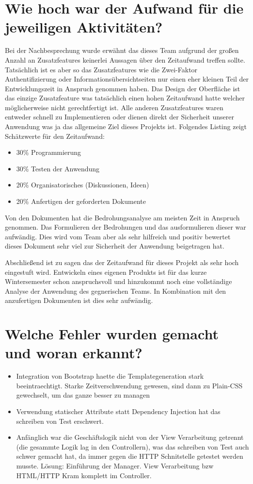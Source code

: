 \documentclass[12pt,DIV14,BCOR10mm,a4paper,parskip=half-,headsepline,headinclude,english,ngerman,bibliography=totocnumbered]{scrreprt}
\begin{document}
\section{Wie hoch war der Aufwand für die jeweiligen Aktivitäten?}
Bei der Nachbesprechung wurde erwähnt das dieses Team aufgrund der großen Anzahl an Zusatzfeatures keinerlei Aussagen über den Zeitaufwand treffen sollte. Tatsächlich ist es aber so das Zusatzfeatures wie die Zwei-Faktor Authentifizierung oder Informationsübersichtseiten nur einen eher kleinen Teil der Entwicklungszeit in Anspruch genommen haben. Das Design der Oberfläche ist das einzige Zusatzfeature was tatsächlich einen hohen Zeitaufwand hatte welcher möglicherweise nicht gerechtfertigt ist. Alle anderen Zusatzfeatures waren entweder schnell zu Implementieren oder dienen direkt der Sicherheit unserer Anwendung was ja das allgemeine Ziel dieses Projekts ist. Folgendes Listing zeigt Schätzwerte für den Zeitaufwand:

\begin{itemize}
  \item 30\% Programmierung
  \item 30\% Testen der Anwendung
  \item 20\% Organisatorisches (Diskussionen, Ideen)
  \item 20\% Anfertigen der geforderten Dokumente
\end{itemize}

Von den Dokumenten hat die Bedrohungsanalyse am meisten Zeit in Anspruch genommen. Das Formulieren der Bedrohungen und das ausformulieren dieser war aufwändig. Dies wird vom Team aber als sehr hilfreich und positiv bewertet dieses Dokument sehr viel zur Sicherheit der Anwendung beigetragen hat.

Abschließend ist zu sagen das der Zeitaufwand für dieses Projekt als sehr hoch eingestuft wird. Entwickeln eines eigenen Produkts ist für das kurze Wintersemester schon anspruchsvoll und hinzukommt noch eine vollständige Analyse der Anwendung des gegnerischen Teams. In Kombination mit den anzufertigen Dokumenten ist dies sehr aufwändig.

\section{Welche Fehler wurden gemacht und woran erkannt?}

\begin{itemize}
  \item Integration von Bootstrap haette die Templategeneration stark beeintraechtigt. Starke Zeitverschwendung gewesen, sind dann zu Plain-CSS gewechselt, um das ganze besser zu managen
  \item Verwendung statischer Attribute statt Dependency Injection hat das schreiben von Test erschwert.
  \item Anfänglich war die Geschäftslogik nicht von der View Verarbeitung getrennt (die gesammte Logik lag in den Controllern), was das schreiben von Test auch schwer gemacht hat, da immer gegen die HTTP Schnitstelle getestet werden musste. Lösung: Einführung der Manager. View Verarbeitung bzw HTML/HTTP Kram komplett im Controller.
\end{itemize}
\end{document}
